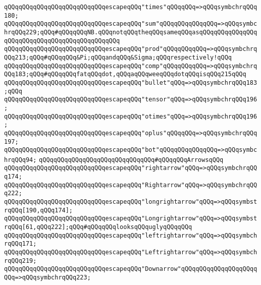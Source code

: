 \verb|qQQqqQQqqQQqqQQqqQQqqQQqqQQqescapeqQQq"times"qQQqqQQq=>qQQqsymbchrqQQq180;|\newline
\verb|qQQqqQQqqQQqqQQqqQQqqQQqqQQqescapeqQQq"sum"qQQqqQQqqQQqqQQq=>qQQqsymbchrqQQq229;qQQq#qQQqqQQqNB.qQQqnotqQQqtheqQQqsameqQQqasqQQqqQQqqQQqqQQqqQQqqQQqqQQqqQQqqQQqqQQqqQQqqQQq|\newline
\verb|qQQqqQQqqQQqqQQqqQQqqQQqqQQqescapeqQQq"prod"qQQqqQQqqQQq=>qQQqsymbchrqQQq213;qQQq#qQQqqQQq&Pi;qQQqandqQQq&Sigma;qQQqrespectively!qQQq|\newline
\verb|qQQqqQQqqQQqqQQqqQQqqQQqqQQqescapeqQQq"comp"qQQqqQQqqQQq=>qQQqsymbchrqQQq183;qQQq#qQQqqQQqfatqQQqdot,qQQqaqQQqweeqQQqdotqQQqisqQQq215qQQq|\newline
\verb|qQQqqQQqqQQqqQQqqQQqqQQqqQQqescapeqQQq"bullet"qQQq=>qQQqsymbchrqQQq183;qQQq|\newline
\verb|qQQqqQQqqQQqqQQqqQQqqQQqqQQqescapeqQQq"tensor"qQQq=>qQQqsymbchrqQQq196;|\newline
\verb|qQQqqQQqqQQqqQQqqQQqqQQqqQQqescapeqQQq"otimes"qQQq=>qQQqsymbchrqQQq196;|\newline
\verb|qQQqqQQqqQQqqQQqqQQqqQQqqQQqescapeqQQq"oplus"qQQqqQQq=>qQQqsymbchrqQQq197;|\newline
\newline
\verb|qQQqqQQqqQQqqQQqqQQqqQQqqQQqescapeqQQq"bot"qQQqqQQqqQQqqQQq=>qQQqsymbchrqQQq94;|\newline
\newline
\verb|qQQqqQQqqQQqqQQqqQQqqQQqqQQqqQQq#qQQqqQQqArrowsqQQq|\newline
\verb|qQQqqQQqqQQqqQQqqQQqqQQqqQQqescapeqQQq"rightarrow"qQQq=>qQQqsymbchrqQQq174;|\newline
\verb|qQQqqQQqqQQqqQQqqQQqqQQqqQQqescapeqQQq"Rightarrow"qQQq=>qQQqsymbchrqQQq222;|\newline
\verb|qQQqqQQqqQQqqQQqqQQqqQQqqQQqescapeqQQq"longrightarrow"qQQq=>qQQqsymbstrqQQq[190,qQQq174];|\newline
\verb|qQQqqQQqqQQqqQQqqQQqqQQqqQQqescapeqQQq"Longrightarrow"qQQq=>qQQqsymbstrqQQq[61,qQQq222];qQQq#qQQqqQQqlooksqQQquglyqQQqqQQq|\newline
\verb|qQQqqQQqqQQqqQQqqQQqqQQqqQQqescapeqQQq"leftrightarrow"qQQq=>qQQqsymbchrqQQq171;|\newline
\verb|qQQqqQQqqQQqqQQqqQQqqQQqqQQqescapeqQQq"Leftrightarrow"qQQq=>qQQqsymbchrqQQq219;|\newline
\verb|qQQqqQQqqQQqqQQqqQQqqQQqqQQqescapeqQQq"Downarrow"qQQqqQQqqQQqqQQqqQQqqQQq=>qQQqsymbchrqQQq223;|\newline
